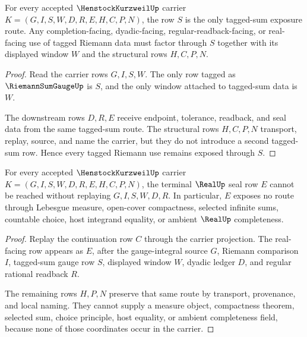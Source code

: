 \begin{theorem}
\label{thm:henstock-kurzweil-riemann-sum-exposure}
For every accepted $\HenstockKurzweilUp$ carrier $K=(G,I,S,W,D,R,E,H,C,P,N)$, the row $S$ is the only tagged-sum exposure route. Any completion-facing, dyadic-facing, regular-readback-facing, or real-facing use of tagged Riemann data must factor through $S$ together with its displayed window $W$ and the structural rows $H,C,P,N$.
\end{theorem}
\begin{proof}
Read the carrier rows $G,I,S,W$. The only row tagged as $\RiemannSumGaugeUp$ is $S$, and the only window attached to tagged-sum data is $W$.

The downstream rows $D,R,E$ receive endpoint, tolerance, readback, and seal data from the same tagged-sum route. The structural rows $H,C,P,N$ transport, replay, source, and name the carrier, but they do not introduce a second tagged-sum row. Hence every tagged Riemann use remains exposed through $S$.
\end{proof}

\begin{theorem}
\label{thm:henstock-kurzweil-real-seal-nonescape}
For every accepted $\HenstockKurzweilUp$ carrier $K=(G,I,S,W,D,R,E,H,C,P,N)$, the terminal $\RealUp$ seal row $E$ cannot be reached without replaying $G,I,S,W,D,R$. In particular, $E$ exposes no route through Lebesgue measure, open-cover compactness, selected infinite sums, countable choice, host integrand equality, or ambient $\RealUp$ completeness.
\end{theorem}
\begin{proof}
Replay the continuation row $C$ through the carrier projection. The real-facing row appears as $E$, after the gauge-integral source $G$, Riemann comparison $I$, tagged-sum gauge row $S$, displayed window $W$, dyadic ledger $D$, and regular rational readback $R$.

The remaining rows $H,P,N$ preserve that same route by transport, provenance, and local naming. They cannot supply a measure object, compactness theorem, selected sum, choice principle, host equality, or ambient completeness field, because none of those coordinates occur in the carrier.
\end{proof}


